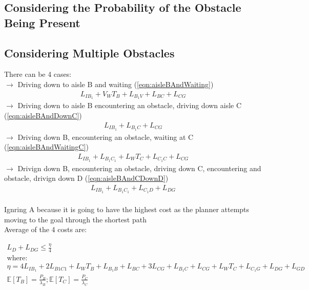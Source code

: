 \documentclass[a4paper,12pt]{article}
\begin{document}
		\subsection{Considering the Probability of the Obstacle Being Present}

		\subsection{Considering Multiple Obstacles}

		There can be 4 cases:\\
		 $\rightarrow$ Driving down to aisle B and waiting (\ref{eqn:aisleBAndWaiting})
		\begin{equation}
			\begin{split}
			L_{IB_1}+V_WT_B+L_{B_1V}+L_{BC}+L_{CG}
			\end{split}
			\label{eqn:aisleBAndWaiting}
			\end{equation}
		$\rightarrow$ Driving down to aisle B encountering an obstacle, driving down aisle C (\ref{eqn:aisleBAndDownC})
		\begin{equation}
			\begin{split}
			L_{IB_1}+L_{B_1C}+L_{CG}
			\end{split}
			\label{eqn:aisleBAndDownC}
		\end{equation}
		$\rightarrow$ Driving down B, encountering an obstacle, waiting at C (\ref{eqn:aisleBAndWaitingC})
		\begin{equation}
			\begin{split}
			L_{IB_1}+L_{B_1C_1}+L_WT_C+L_{C_1C}+L_{CG}
			\end{split}
			\label{eqn:aisleBAndWaitingC}
		\end{equation}
		$\rightarrow$ Drivign down B, encountering an obstacle, driving down C, encountering and obstacle, drivign down D (\ref{eqn:aisleBAndCDownD})
		\begin{equation}
			\begin{split}
			L_{IB_1}+L_{B_1C_1}+L_{C_1D}+L_{DG}
			\end{split}
			\label{eqn:aisleBAndCDownD}
		\end{equation}
		\\
		Ignring A because it is going to have the highest cost as the planner attempts moving to the goal through the shortest path
		\\
		Average of the 4 costs are:

		\begin{equation}
			\begin{split}
			L_D+L_{DG} \leq \frac{\eta}{4}\\
			\text{where:} \\
			\eta = 4L_{IB_1}+2L_{B1C1}+L_WT_B+L_{B_1B}+L_{BC}+3L_{CG}+L_{B_1C}+L_{CG}+L_WT_C+L_{C_1G}+L_{DG}+L_{GD}\\
			\mathbb{E}[T_B] = \frac{P_B}{\lambda_B}; \mathbb{E}[T_C]=\frac{P_C}{\lambda_C}
			\end{split}
			\label{eqn:costAverage}
		\end{equation}
\end{document}
